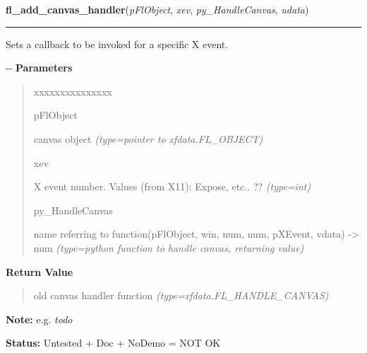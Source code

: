     \vspace{0.5ex}

\hspace{.8\funcindent}\begin{boxedminipage}{\funcwidth}

    \raggedright \textbf{fl\_add\_canvas\_handler}(\textit{pFlObject}, \textit{xev}, \textit{py\_HandleCanvas}, \textit{udata})

    \vspace{-1.5ex}

    \rule{\textwidth}{0.5\fboxrule}
\setlength{\parskip}{2ex}

Sets a callback to be invoked for a specific X event.

-{}-
\setlength{\parskip}{1ex}
      \textbf{Parameters}
      \vspace{-1ex}

      \begin{quote}
        \begin{Ventry}{xxxxxxxxxxxxxxx}

          \item[pFlObject]


canvas object
            {\it (type=pointer to xfdata.FL\_OBJECT)}

          \item[xev]


X event number. Values (from X11): Expose, etc.. ??
            {\it (type=int)}

          \item[py\_HandleCanvas]


name referring to function(pFlObject, win, num, num, pXEvent,
vdata) -> num
            {\it (type=python function to handle canvas, returning value)}

        \end{Ventry}

      \end{quote}

      \textbf{Return Value}
    \vspace{-1ex}

      \begin{quote}

old canvas handler function
      {\it (type=xfdata.FL\_HANDLE\_CANVAS)}

      \end{quote}

\textbf{Note:} 
e.g. \emph{todo}


\textbf{Status:} 
Untested + Doc + NoDemo = NOT OK


    \end{boxedminipage}

